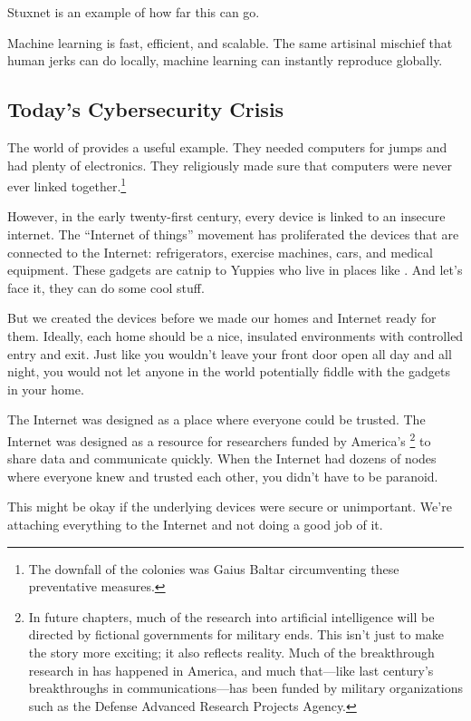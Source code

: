 Stuxnet is an example of how far this can go.

Machine learning is fast, efficient, and scalable.  The same artisinal
mischief that human jerks can do locally, machine learning can
instantly reproduce globally.  

\subsection{Today's Cybersecurity Crisis}

The world of  provides a useful example.
They needed computers for jumps and had plenty of electronics.  They
religiously made sure that computers were never ever linked
together.\footnote{The downfall of the colonies was Gaius Baltar
  circumventing these preventative measures.}

However, in the early twenty-first century, every device is linked to
an insecure internet.  The ``Internet of things'' movement has
proliferated the devices that are connected to the Internet:
refrigerators, exercise machines, cars, and medical equipment.  These
gadgets are catnip to Yuppies who live in places like \crunchyCity{}.
And let's face it, they can do some cool stuff.

But we created the devices before we made our homes and Internet ready
for them.  Ideally, each home should be a nice, insulated environments
with controlled entry and exit.  Just like you wouldn't leave your
front door open all day and all night, you would not let anyone in the
world potentially fiddle with the gadgets in your home.  

The Internet was designed as a place where everyone could be trusted.
The Internet was designed as a resource for researchers funded by
America's \footnote{In future chapters, much of the
  research into artificial intelligence will be directed by fictional
  governments for military ends.  This isn't just to make the story
  more exciting; it also reflects reality.  Much of the breakthrough
  research in  has happened in America, and much that---like
  last century's breakthroughs in communications---has been funded by
  military organizations such as the Defense Advanced Research
  Projects Agency.} to share data and communicate quickly.  When the
Internet had dozens of nodes where everyone knew and trusted each
other, you didn't have to be paranoid.

This might be okay if the underlying devices were secure or
unimportant.  We're attaching everything to the Internet and not doing
a good job of it.  

